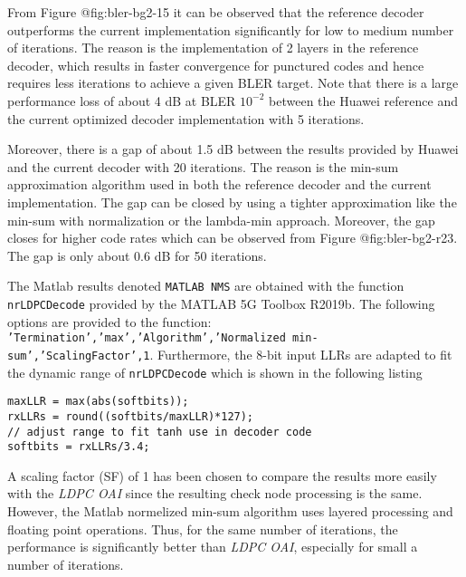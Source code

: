 \documentclass{article}
\begin{document}
From Figure {@fig:bler-bg2-15} it can be observed that the reference decoder outperforms the current implementation significantly for low to medium number of iterations. The reason is the implementation of 2 layers in the reference decoder, which results in faster convergence for punctured codes and hence requires less iterations to achieve a given BLER target. Note that there is a large performance loss of about 4 dB at BLER $10^{-2}$ between the Huawei reference and the current optimized decoder implementation with 5 iterations.

Moreover, there is a gap of about 1.5 dB between the results provided by Huawei and the current decoder with 20 iterations. The reason is the min-sum approximation algorithm used in both the reference decoder and the current implementation. The gap can be closed by using a tighter approximation like the min-sum with normalization or the lambda-min approach. Moreover, the gap closes for higher code rates which can be observed from Figure {@fig:bler-bg2-r23}. The gap is only about 0.6 dB for 50 iterations.

The Matlab results denoted \texttt{MATLAB NMS} are obtained with the function \texttt{nrLDPCDecode} provided by the MATLAB 5G Toolbox R2019b. The following options are provided to the function: \texttt{'Termination','max','Algorithm','Normalized min-sum','ScalingFactor',1}. Furthermore, the 8-bit input LLRs are adapted to fit the dynamic range of \texttt{nrLDPCDecode} which is shown in the following listing  

\begin{lstlisting}[frame=single,caption={Input adaptation for MATLAB LDPC Decoder},label=ldpc_matlab]
maxLLR = max(abs(softbits));
rxLLRs = round((softbits/maxLLR)*127);
// adjust range to fit tanh use in decoder code 
softbits = rxLLRs/3.4;
\end{lstlisting}

A scaling factor (SF) of 1 has been chosen to compare the results more easily with the \textit{LDPC OAI} since the resulting check node processing is the same. However, the Matlab normelized min-sum algorithm uses layered processing and floating point operations. Thus, for the same number of iterations, the performance is significantly better than \textit{LDPC OAI}, especially for small a number of iterations.
\end{document}
